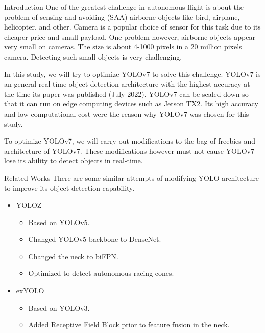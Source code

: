 \documentclass[final,hyperref={pdfpagelabels=false}]{beamer}
\begin{document}
\begin{frame}[t]
\begin{columns}[t]
\begin{column}{.465\textwidth}
\begin{block}{Introduction}
  One of the greatest challenge in autonomous flight
  is about the problem of sensing and avoiding (SAA) airborne objects like bird, airplane, helicopter, and other.
  Camera is a popular choice of sensor for this task due to its cheaper price and small payload.
  One problem however, airborne objects appear very small on cameras.
  The size is about 4-1000 pixels in a 20 million pixels camera.
  Detecting such small objects is very challenging.

  In this study, we will try to optimize YOLOv7 to solve this challenge.
  YOLOv7 is an general real-time object detection architecture with the highest accuracy at the time its paper was published (July 2022).
  YOLOv7 can be scaled down so that it can run on edge computing devices such as Jetson TX2.
  Its high accuracy and low computational cost were the reason why YOLOv7 was chosen for this study.

  To optimize YOLOv7, we will carry out modifications to the bag-of-freebies and architecture of YOLOv7.
  These modifications however must not cause YOLOv7 lose its ability to detect objects in real-time.

\end{block}


\begin{block}{Related Works}
  There are some similar attempts of modifying YOLO architecture to improve its object detection capability.
  \begin{itemize}
    \item YOLOZ
    \begin{itemize}
      \item Based on YOLOv5.
      \item Changed YOLOv5 backbone to DenseNet.
      \item Changed the neck to biFPN.
      \item Optimized to detect autonomous racing cones.
    \end{itemize}
    \item exYOLO
    \begin{itemize}
      \item Based on YOLOv3.
      \item Added Receptive Field Block prior to feature fusion in the neck.
    \end{itemize}
  \end{itemize}


\end{block}
\end{column}
\end{columns}
\end{frame}
\end{document}
